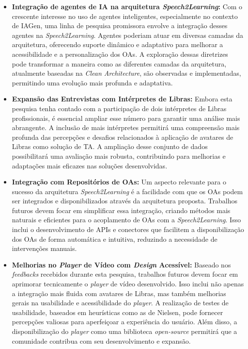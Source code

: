 \begin{itemize}

    \item \textbf{Integração de agentes de IA na arquitetura \textit{Speech2Learning}:} Com o crescente interesse no uso de agentes inteligentes, especialmente no contexto de IAGen, uma linha de pesquisa promissora envolve a integração desses agentes na \textit{Speech2Learning}. Agentes poderiam atuar em diversas camadas da arquitetura, oferecendo suporte dinâmico e adaptativo para melhorar a acessibilidade e a personalização dos OAs. A exploração dessas diretrizes pode transformar a maneira como as diferentes camadas da arquitetura, atualmente baseadas na \textit{Clean Architecture}, são observadas e implementadas, permitindo uma evolução mais profunda e adaptativa.

    \item \textbf{Expansão das Entrevistas com Intérpretes de Libras:} Embora esta pesquisa tenha contado com a participação de dois intérpretes de Libras profissionais, é essencial ampliar esse número para garantir uma análise mais abrangente. A inclusão de mais intérpretes permitirá uma compreensão mais profunda das percepções e desafios relacionados à aplicação de avatares de Libras como solução de TA. A ampliação desse conjunto de dados possibilitará uma avaliação mais robusta, contribuindo para melhorias e adaptações mais eficazes nas soluções desenvolvidas.

    \item \textbf{Integração com Repositórios de OAs:} Um aspecto relevante para o sucesso da arquitetura \textit{Speech2Learning} é a facilidade com que os OAs podem ser integrados e disponibilizados através da arquitetura proposta. Trabalhos futuros devem focar em simplificar essa integração, criando métodos mais naturais e eficientes para o acoplamento de OAs com a \textit{Speech2Learning}. Isso inclui o desenvolvimento de APIs e conectores que facilitem a disponibilização dos OAs de forma automática e intuitiva, reduzindo a necessidade de intervenções manuais.

    \item \textbf{Melhorias no \textit{Player} de Vídeo com \textit{Design} Acessível:} Baseado nos \textit{feedbacks} recebidos durante esta pesquisa, trabalhos futuros devem focar em aprimorar tecnicamente o \textit{player} de vídeo desenvolvido. Isso inclui não apenas a integração mais fluida com avatares de Libras, mas também melhorias gerais na usabilidade e acessibilidade do \textit{player}. A realização de testes de usabilidade, baseados em heurísticas como as de Nielsen, pode fornecer percepções valiosas para aperfeiçoar a experiência do usuário. Além disso, a disponibilização do \textit{player} como uma biblioteca \textit{open-source} permitirá que a comunidade contribua com seu desenvolvimento e expansão.


\end{itemize}
